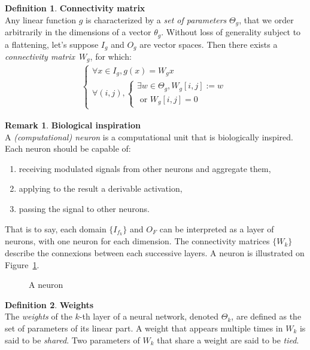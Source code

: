 \documentclass{article}
\theoremstyle{definition}
\newtheorem{definition}{Definition}[section]
\newtheorem{remark}{Remark}
\newcommand{\ovec}{}
\begin{document}
\begin{definition}\textbf{Connectivity matrix}\\
Any linear function $g$ is characterized by a \emph{set of parameters} $\Theta_g$, that we order arbitrarily in the dimensions of a vector $\theta_g$. Without loss of generality subject to a flattening, let's suppose $I_g$ and $O_g$ are vector spaces. Then there exists a \emph{connectivity matrix}~$W_g$, for which:
\begin{gather}
\left\{
\begin{array}{l}
  \forall \ovec{x} \in I_g, g(\ovec{x}) = W_g\ovec{x}\\
  \forall (i,j),
    \begin{cases}
      \exists w \in \Theta_g, W_g[i,j] := w \\
      \text{ or } W_g[i,j] = 0
    \end{cases}
\end{array}
\right.
\end{gather}
\end{definition}

\begin{remark}\textbf{Biological inspiration}\\
A \emph{(computational) neuron} is a computational unit that is biologically inspired. Each neuron should be capable of:
\begin{enumerate}
\item receiving modulated signals from other neurons and aggregate them,
\item applying to the result a derivable activation,
\item passing the signal to other neurons.
\end{enumerate}
That is to say, each domain $\{I_{f_k}\}$ and $O_F$ can be interpreted as a layer of neurons, with one neuron for each dimension. The connectivity matrices $\{W_k\}$ describe the connexions between each successive layers. A neuron is illustrated on Figure~\ref{fig:neuron}.
\end{remark}

\begin{figure}[h]
\centering
{}
\caption{A neuron}
\label{fig:neuron}
\end{figure}

\begin{definition}\textbf{Weights}\\
The \emph{weights} of the $k$-th layer of a neural network, denoted $\Theta_k$, are defined as the set of parameters of its linear part.
A weight that appears multiple times in $W_k$ is said to be \emph{shared}. Two parameters of $W_k$ that share a weight are said to be \emph{tied}.
\end{definition}
\end{document}
